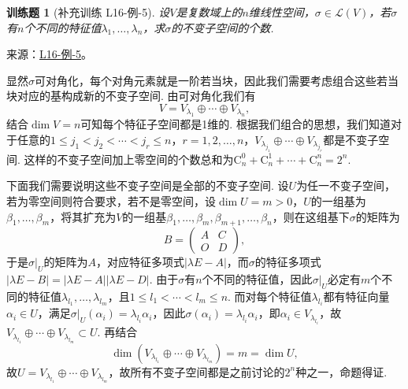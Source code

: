 \documentclass[UTF8,12pt,a4paper,fontset=fandol]{ctexart}
\newtheorem{exercise}{训练题}[section]
\begin{document}
\begin{exercise}[补充训练 L16-例-5]\label{prob:L16-例-5}
设$V$是复数域上的$n$维线性空间，$\sigma\in\mathcal{L}(V)$，若$\sigma$有$n$个不同的特征值$\lambda_1,\ldots,\lambda_n$，求$\sigma$的不变子空间的个数.
\end{exercise}
\noindent 来源：\href{https://github.com/yhwu-is/Linear-Algebra-Left-Undone/blob/new/%E8%AE%B2%E4%B9%89/%E4%B8%93%E9%A2%98/16%20%E8%8B%A5%E5%BD%93%E6%A0%87%E5%87%86%E5%BD%A2.tex}{L16-例-5}。
\begin{solve}
显然$\sigma$可对角化，每个对角元素就是一阶若当块，因此我们需要考虑组合这些若当块对应的基构成新的不变子空间. 由可对角化我们有
    \[V=V_{\lambda_1}\oplus\cdots\oplus V_{\lambda_n},\]
    结合$\dim V=n$可知每个特征子空间都是1维的. 根据我们组合的思想，我们知道对于任意的$1\leqslant j_1<j_2<\cdots<j_r\leqslant n$，$r=1,2,\ldots,n$，$V_{\lambda_{j_1}}\oplus\cdots\oplus V_{\lambda_{j_r}}$都是不变子空间. 这样的不变子空间加上零空间的个数总和为$\mathrm{C}_n^0+\mathrm{C}_n^1+\cdots+\mathrm{C}_n^n=2^n$.

    下面我们需要说明这些不变子空间是全部的不变子空间. 设$U$为任一不变子空间，若为零空间则符合要求，若不是零空间，设$\dim U=m>0$，$U$的一组基为$\beta_1,\ldots,\beta_m$，将其扩充为$V$的一组基$\beta_1,\ldots,\beta_m,\beta_{m+1},\ldots,\beta_n$，则在这组基下$\sigma$的矩阵为
    \[B=\begin{pmatrix}
            A & C \\ O & D
        \end{pmatrix},\]
    于是$\sigma\vert_U$的矩阵为$A$，对应特征多项式$|\lambda E-A|$，而$\sigma$的特征多项式$|\lambda E-B|=|\lambda E-A||\lambda E-D|$. 由于$\sigma$有$n$个不同的特征值，因此$\sigma\vert_U$必定有$m$个不同的特征值$\lambda_{l_1},\ldots,\lambda_{l_m}$，且$1\leqslant l_1<\cdots<l_m\leqslant n$. 而对每个特征值$\lambda_{l_i}$都有特征向量$\alpha_i\in U$，满足$\sigma\vert_U(\alpha_i)=\lambda_{l_i}\alpha_i$，因此$\sigma(\alpha_i)=\lambda_{l_i}\alpha_i$，即$\alpha_i\in V_{\lambda_{l_i}}$，故$V_{\lambda_{l_1}}\oplus\cdots\oplus V_{\lambda_{l_m}}\subset U$. 再结合
    \[\dim(V_{\lambda_{l_1}}\oplus\cdots\oplus V_{\lambda_{l_m}})=m=\dim U,\]
    故$U=V_{\lambda_{l_1}}\oplus\cdots\oplus V_{\lambda_{l_m}}$，故所有不变子空间都是之前讨论的$2^n$种之一，命题得证.
\end{solve}
\end{document}
